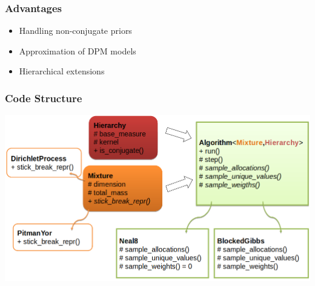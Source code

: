 \begin{frame}
	\frametitle{Advantages}
		\begin{itemize}
		     \item Handling non-conjugate priors
		    \item Approximation of DPM models %
		    \item Hierarchical extensions
	\end{itemize}
\end{frame}

\begin{frame}
	\frametitle{Code Structure}
	\includegraphics[width=\linewidth]{etc/code_map.png}
\end{frame}
